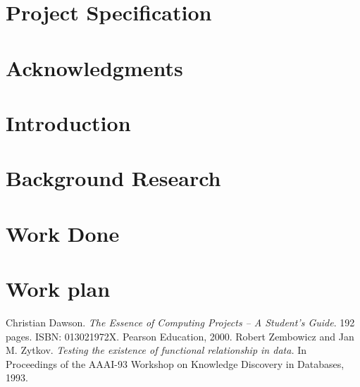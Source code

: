 \documentclass[]{UCD_CS_FYP_Report}
\begin{document}
\maketitle


\chapter*{Project Specification}



\begin{abstract}
		
\end{abstract}
\newpage


\chapter*{Acknowledgments}



\tableofcontents{}\newpage
\newpage


\chapter{Introduction}



\chapter{Background Research}



\chapter{Work Done}



\chapter{Work plan}


\newpage
\begin{thebibliography}{99}
	 Christian Dawson. \emph{The Essence of Computing Projects -- A Student's Guide}. 192 pages. ISBN: 013021972X. Pearson Education, 2000.
	Robert Zembowicz and Jan M. Zytkov. \emph{Testing the existence of functional relationship in data.} In Proceedings of the AAAI-93 Workshop on Knowledge Discovery in Databases, 1993.
\end{thebibliography}\label{endpage}
\end{document}
